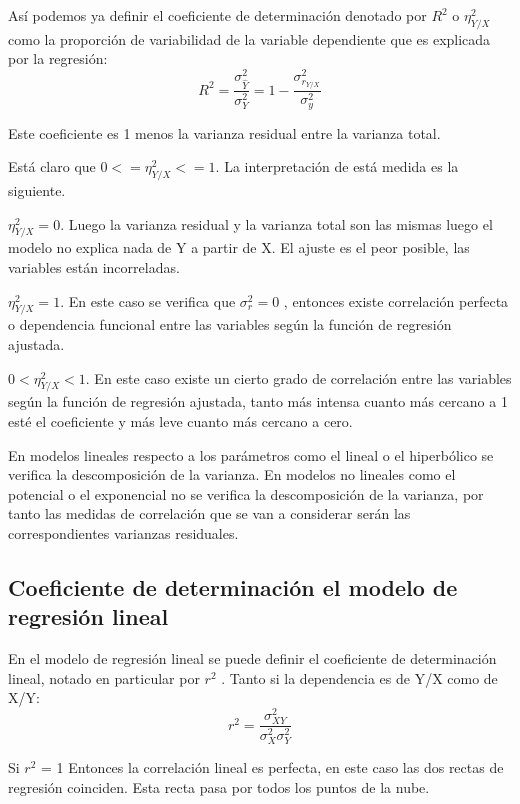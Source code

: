 \documentclass{article}
\begin{document}
	
	Así podemos ya definir el coeficiente de determinación denotado por $R^2$ o $\eta_{Y/X}^2$ como la proporción de variabilidad de la variable dependiente que es explicada por la regresión: $$R^2 = \frac{\sigma_{\hat{Y}}^2}{\sigma_Y^2}  = 1 - \frac{\sigma_{r_{Y/X}}^2}{\sigma_y^2}$$
	
	Este coeficiente es 1 menos la varianza residual entre la varianza total.
	
	Está claro que $ 0 <= \eta_{Y/X}^2  <= 1 $. La interpretación de está medida es la siguiente.
	
\vspace{2mm}	
	
	$ \eta_{Y/X}^2 = 0 $. Luego la varianza residual y la varianza total son las mismas luego el modelo no explica nada de Y a partir de X. El ajuste es el peor posible, las variables están incorreladas.
	
\vspace{2mm}	
	
	$ \eta_{Y/X}^2 = 1 $. En este caso se verifica que $\sigma_r^2 = 0$ , entonces existe correlación perfecta o dependencia funcional entre las variables según la función de regresión ajustada.	
	
\vspace{2mm}	
	
	$ 0 < \eta_{Y/X}^2 < 1 $. En este caso existe un cierto grado de correlación entre las variables según la función de regresión ajustada, tanto más intensa cuanto más cercano a 1 esté el coeficiente y más leve cuanto más cercano a cero.
	
En modelos lineales respecto a los parámetros como el lineal o el hiperbólico se verifica la descomposición de la varianza. En modelos no lineales como el potencial o el exponencial no se verifica la descomposición de la varianza, por tanto las medidas de correlación que se van a considerar serán las correspondientes varianzas residuales.


\subsection{Coeficiente de determinación el modelo de regresión lineal}
En el modelo de regresión lineal se puede definir el coeficiente de determinación lineal, notado en particular por $r^2$ . Tanto si la dependencia es de Y/X como de X/Y:
$$ r^2 = \frac{\sigma_{XY}^2}{ \sigma_{X}^2 \sigma_{Y}^2 } $$

Si $r^2$ = 1 Entonces la correlación lineal es perfecta, en este caso las dos rectas de regresión coinciden. Esta recta pasa por todos los puntos de la nube.
\end{document}
